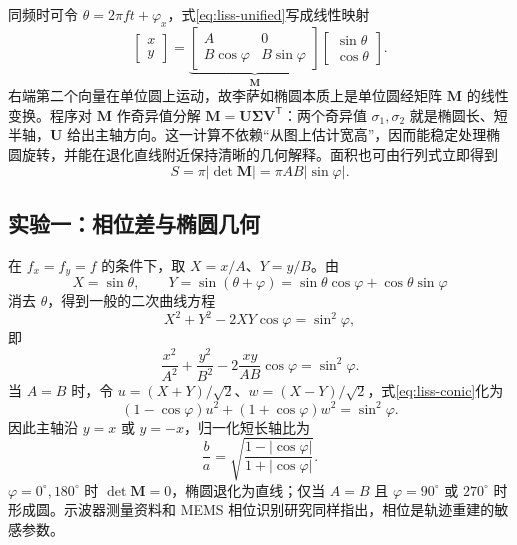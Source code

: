\documentclass[UTF8,a4paper,zihao=-4]{ctexart}
\begin{document}
同频时可令 $\theta=2\pi ft+\varphi_x$，式\eqref{eq:liss-unified}写成线性映射
\begin{equation}
 \begin{bmatrix}x\\y\end{bmatrix}
 =\underbrace{\begin{bmatrix}A&0\\B\cos\varphi&B\sin\varphi\end{bmatrix}}_{\boldsymbol M}
 \begin{bmatrix}\sin\theta\\\cos\theta\end{bmatrix}.
 \label{eq:liss-matrix}
\end{equation}
右端第二个向量在单位圆上运动，故李萨如椭圆本质上是单位圆经矩阵 $\boldsymbol M$ 的线性变换。程序对 $\boldsymbol M$ 作奇异值分解 $\boldsymbol M=\boldsymbol U\boldsymbol\Sigma\boldsymbol V^{\mathsf T}$：两个奇异值 $\sigma_1,\sigma_2$ 就是椭圆长、短半轴，$\boldsymbol U$ 给出主轴方向。这一计算不依赖“从图上估计宽高”，因而能稳定处理椭圆旋转，并能在退化直线附近保持清晰的几何解释。面积也可由行列式立即得到
\begin{equation}
 S=\pi|\det\boldsymbol M|=\pi AB|\sin\varphi|.
 \label{eq:liss-area}
\end{equation}

\subsection{实验一：相位差与椭圆几何}
在 $f_x=f_y=f$ 的条件下，取 $X=x/A$、$Y=y/B$。由
\begin{equation}
 X=\sin\theta,\qquad
 Y=\sin(\theta+\varphi)=\sin\theta\cos\varphi+\cos\theta\sin\varphi
\end{equation}
消去 $\theta$，得到一般的二次曲线方程
\begin{equation}
  X^2+Y^2-2XY\cos\varphi=\sin^2\varphi,
  \label{eq:liss-conic}
\end{equation}
即
\begin{equation}
  \frac{x^2}{A^2}+\frac{y^2}{B^2}
  -2\frac{xy}{AB}\cos\varphi=\sin^2\varphi.
\end{equation}
当 $A=B$ 时，令 $u=(X+Y)/\sqrt2$、$w=(X-Y)/\sqrt2$，式\eqref{eq:liss-conic}化为
\begin{equation}
 (1-\cos\varphi)u^2+(1+\cos\varphi)w^2=\sin^2\varphi.
\end{equation}
因此主轴沿 $y=x$ 或 $y=-x$，归一化短长轴比为
\begin{equation}
 \frac{b}{a}=\sqrt{\frac{1-|\cos\varphi|}{1+|\cos\varphi|}}.
 \label{eq:liss-axis-ratio}
\end{equation}
$\varphi=0^\circ,180^\circ$ 时 $\det\boldsymbol M=0$，椭圆退化为直线；仅当 $A=B$ 且 $\varphi=90^\circ$ 或 $270^\circ$ 时形成圆。示波器测量资料和 MEMS 相位识别研究同样指出，相位是轨迹重建的敏感参数\cite{hogan2019,birla2020}。
\end{document}
